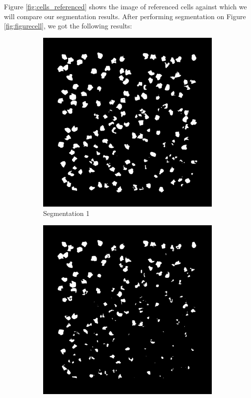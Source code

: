 \documentclass[%
	a4paper, %
	12pt, %
	english, %
	bibtotoc %
]{scrartcl}
\begin{document}
Figure \ref{fig:cells_referenced} shows the image of referenced cells against which we will compare our segmentation results. After performing segmentation on Figure \ref{fig:figurecell}, we got the following results:

\begin{figure}[H]
    \centering
    \begin{subfigure}[b]{0.2\textwidth}
        \includegraphics[width=\textwidth]{segmentation_thresholding_92_illuminated.png}
        \caption{Segmentation 1}
        \label{Segmentation1}
    \end{subfigure}
    \hfill
    \begin{subfigure}[b]{0.2\textwidth}
        \includegraphics[width=\textwidth]{segmentation_thresholding_105_illuminated.png}

\end{subfigure}
\end{figure}
\end{document}

